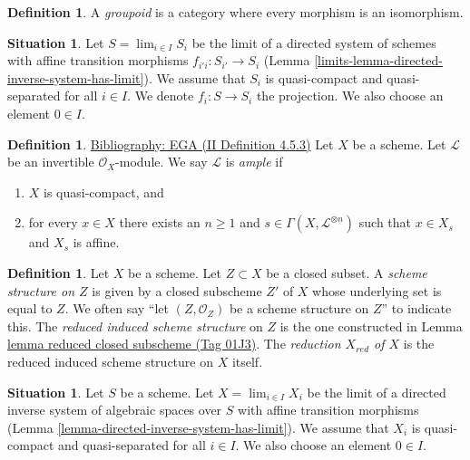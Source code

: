 \documentclass{amsart}
\newenvironment{reference}{\comment}{\endcomment}
\theoremstyle{plain}
\theoremstyle{definition}
\newtheorem{definition}[subsection]{Definition}
\newtheorem{situation}[subsection]{Situation}
\theoremstyle{remark}
\numberwithin{equation}{subsection}
\def\lim{\mathop{\mathrm{lim}}\nolimits}
\begin{document}
\begin{definition}
\label{categories-definition-groupoid}
A {\it groupoid} is a category where every morphism is an isomorphism.
\end{definition}

\begin{situation}
\label{limits-situation-descent}
Let $S = \lim_{i \in I} S_i$ be the limit of a directed system of schemes
with affine transition morphisms $f_{i'i} : S_{i'} \to S_i$
(Lemma \ref{limits-lemma-directed-inverse-system-has-limit}).
We assume that $S_i$ is quasi-compact and quasi-separated for all $i \in I$.
We denote $f_i : S \to S_i$ the projection.
We also choose an element $0 \in I$.
\end{situation}

\begin{definition}
\label{properties-definition-ample}
\begin{reference}
\href{https://stacks.math.columbia.edu/bibliography}{Bibliography: EGA (II Definition 4.5.3)}
\end{reference}
Let $X$ be a scheme.
Let $\mathcal{L}$ be an invertible $\mathcal{O}_X$-module.
We say $\mathcal{L}$ is {\it ample} if
\begin{enumerate}
\item $X$ is quasi-compact, and
\item for every $x \in X$ there exists an $n \geq 1$
and $s \in \Gamma(X, \mathcal{L}^{\otimes n})$ such
that $x \in X_s$ and $X_s$ is affine.
\end{enumerate}
\end{definition}

\begin{definition}
\label{schemes-definition-reduced-induced-scheme}
Let $X$ be a scheme. Let $Z \subset X$ be a closed subset.
A {\it scheme structure on $Z$} is given by a closed subscheme $Z'$ of
$X$ whose underlying set is equal to $Z$. We often say
``let $(Z, \mathcal{O}_Z)$ be a scheme structure on $Z$'' to
indicate this. The {\it reduced induced scheme structure}
on $Z$ is the one constructed in Lemma \href{https://stacks.math.columbia.edu/tag/01J3}{lemma reduced closed subscheme (Tag 01J3)}.
The {\it reduction $X_{red}$ of $X$} is the reduced induced scheme
structure on $X$ itself.
\end{definition}

\begin{situation}
\label{situation-descent}
Let $S$ be a scheme. Let $X = \lim_{i \in I} X_i$ be the limit of a directed
inverse system of algebraic spaces over $S$ with affine transition morphisms
(Lemma \ref{lemma-directed-inverse-system-has-limit}).
We assume that $X_i$ is quasi-compact and quasi-separated for all $i \in I$.
We also choose an element $0 \in I$.
\end{situation}
\end{document}
